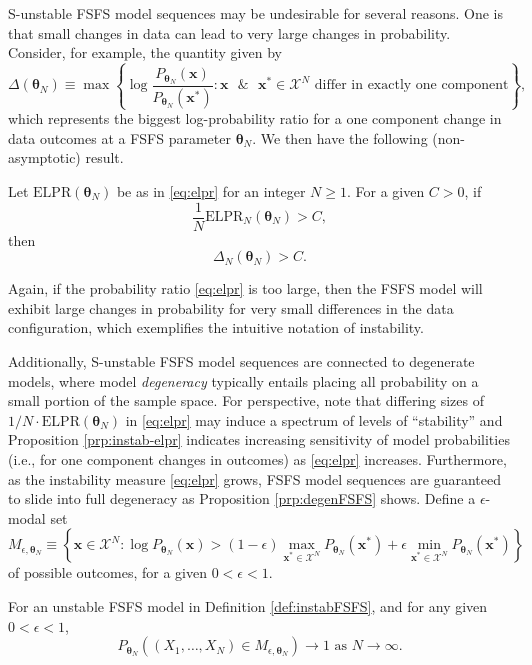 \documentclass[12pt]{article}
\theoremstyle{definition}
\let\BeginKnitrBlock\begin \let\EndKnitrBlock\end
\begin{document}
S-unstable FSFS model sequences may be undesirable for several reasons.
One is that small changes in data can lead to very large changes in
probability. Consider, for example, the quantity given by \[
\Delta(\boldsymbol \theta_N) \equiv \max \left\{\log \frac{P_{\boldsymbol \theta_N}(\boldsymbol x)}{P_{\boldsymbol \theta_N}(\boldsymbol x^*)} : \boldsymbol x \text{ }\& \text{ } \boldsymbol x^* \in \mathcal{X}^N \text{ differ in exactly one component}\right\},
\] which represents the biggest log-probability ratio for a one
component change in data outcomes at a FSFS parameter
\(\boldsymbol \theta_N\). We then have the following (non-asymptotic)
result.

\BeginKnitrBlock{proposition}
\protect\hypertarget{prp:instab-elpr}{}{\label{prp:instab-elpr}}Let
\(\text{ELPR}(\boldsymbol \theta_N)\) be as in \eqref{eq:elpr} for an
integer \(N \ge 1\). For a given \(C>0\), if
\[\frac{1}{N}\text{ELPR}_N(\boldsymbol \theta_N) > C,\] then
\[\Delta_N(\boldsymbol \theta_N) > C.\]
\EndKnitrBlock{proposition}

Again, if the probability ratio \eqref{eq:elpr} is too large, then the
FSFS model will exhibit large changes in probability for very small
differences in the data configuration, which exemplifies the intuitive
notation of instability.

Additionally, S-unstable FSFS model sequences are connected to
degenerate models, where model \emph{degeneracy} typically entails
placing all probability on a small portion of the sample space. For
perspective, note that differing sizes of
\(1/N\cdot\text{ELPR}(\boldsymbol \theta_N)\) in \eqref{eq:elpr} may
induce a spectrum of levels of ``stability'' and Proposition
\ref{prp:instab-elpr} indicates increasing sensitivity of model
probabilities (i.e., for one component changes in outcomes) as
\eqref{eq:elpr} increases. Furthermore, as the instability measure
\eqref{eq:elpr} grows, FSFS model sequences are guaranteed to slide into
full degeneracy as Proposition \ref{prp:degenFSFS} shows. Define a
\(\epsilon\)-modal set \[
M_{\epsilon, \boldsymbol \theta_N} \equiv \left\{\boldsymbol x \in \mathcal{X}^N: \log P_{\boldsymbol \theta_N}(\boldsymbol x) > (1-\epsilon)\max\limits_{\boldsymbol x^* \in \mathcal{X}^N}P_{\boldsymbol \theta_N}(\boldsymbol x^*) + \epsilon\min\limits_{\boldsymbol x^* \in \mathcal{X}^N}P_{\boldsymbol \theta_N}(\boldsymbol x^*) \right\}
\] of possible outcomes, for a given \(0 < \epsilon < 1\).

\BeginKnitrBlock{proposition}
\protect\hypertarget{prp:degenFSFS}{}{\label{prp:degenFSFS}}For an unstable
FSFS model in Definition \ref{def:instabFSFS}, and for any given
\(0 < \epsilon < 1\), \[
P_{\boldsymbol \theta_N}\left((X_1, \dots, X_N) \in M_{\epsilon, \boldsymbol \theta_N}\right) \rightarrow 1 \text{ as } N \rightarrow \infty.
\]
\EndKnitrBlock{proposition}
\end{document}
